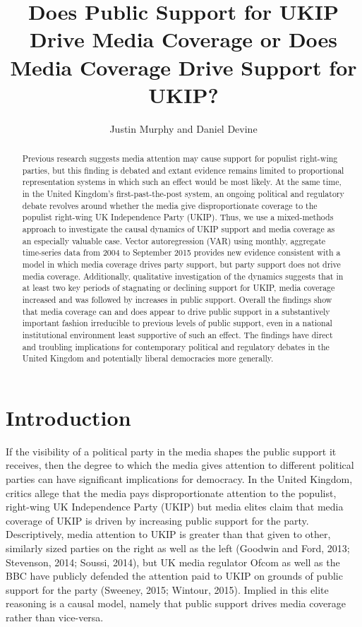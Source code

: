 \documentclass[12pt,article]{article}
\title{Does Public Support for UKIP Drive Media Coverage or Does Media Coverage
Drive Support for UKIP?}
\author{Justin Murphy and Daniel Devine}
\date{}
\begin{document}
\maketitle

\begin{abstract}
Previous research suggests media attention may cause support for populist right-wing parties, but this finding is debated and extant evidence remains limited to proportional representation systems in which such an effect would be most likely. At the same time, in the United Kingdom's first-past-the-post system, an ongoing political and regulatory debate revolves around whether the media give disproportionate coverage to the populist right-wing UK Independence Party (UKIP). Thus, we use a mixed-methods approach to investigate the causal dynamics of UKIP support and media coverage as an especially valuable case. Vector autoregression (VAR) using monthly, aggregate time-series data from 2004 to September 2015 provides new evidence consistent with a model in which media coverage drives party support, but party support does not drive media coverage. Additionally, qualitative investigation of the dynamics suggests that in at least two key periods of stagnating or declining support for UKIP, media coverage increased and was followed by increases in public support. Overall the findings show that media coverage can and does appear to drive public support in a substantively important fashion irreducible to previous levels of public support, even in a national institutional environment least supportive of such an effect. The findings have direct and troubling implications for contemporary political and regulatory debates in the United Kingdom and potentially liberal democracies more generally.
\end{abstract}
\doublespacing

\section{Introduction}\label{introduction}

If the visibility of a political party in the media shapes the public
support it receives, then the degree to which the media gives attention
to different political parties can have significant implications for
democracy. In the United Kingdom, critics allege that the media pays
disproportionate attention to the populist, right-wing UK Independence
Party (UKIP) but media elites claim that media coverage of UKIP is
driven by increasing public support for the party. Descriptively, media
attention to UKIP is greater than that given to other, similarly sized
parties on the right as well as the left (Goodwin and Ford, 2013;
Stevenson, 2014; Soussi, 2014), but UK media regulator Ofcom as well as
the BBC have publicly defended the attention paid to UKIP on grounds of
public support for the party (Sweeney, 2015; Wintour, 2015). Implied in
this elite reasoning is a causal model, namely that public support
drives media coverage rather than vice-versa.
\end{document}
